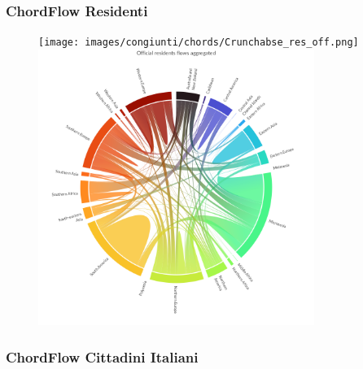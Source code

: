 \subsubsection{ChordFlow Residenti}
\begin{figure}[t]
    \centering
    \texttt{[image: images/congiunti/chords/Crunchabse\_res\_off.png]}
    \includegraphics[width=0.8\textwidth]{images/congiunti/chords/Offcial_res.png}
    \label{fig:chordoff_res_true}
\end{figure}


\subsubsection{ChordFlow Cittadini Italiani}


